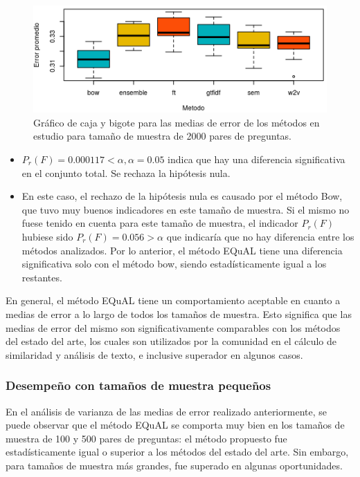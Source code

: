 \begin{figure}
	\centering
	\includegraphics[width=0.7\linewidth]{10_resultados/imagenes/anova_2000}
	\caption{Gráfico de caja y bigote para las medias de error de los métodos en estudio para tamaño de muestra de 2000 pares de preguntas.}
	\label{fig:anova2000}
\end{figure}

\begin{itemize}
	\item \(P_r(F)= 0.000117 < \alpha, \alpha = 0.05\) indica que hay una diferencia significativa en el conjunto total. Se rechaza la hipótesis nula.
	\item En este caso, el rechazo de la hipótesis nula es causado por el método Bow, que tuvo muy buenos indicadores en este tamaño de muestra. Si el mismo no fuese tenido en cuenta para este tamaño de muestra, el indicador \(P_r(F)\) hubiese sido  \(P_r(F)= 0.056 > \alpha\) que indicaría que no hay diferencia entre los métodos analizados. Por lo anterior, el método EQuAL tiene una diferencia significativa solo con el método bow, siendo estadísticamente igual a los restantes.
\end{itemize}

\bigskip En general, el método EQuAL tiene un comportamiento aceptable en cuanto a medias de error a lo largo de todos los tamaños de muestra. Esto significa que las medias de error del mismo son significativamente comparables con los métodos del estado del arte, los cuales son utilizados por la comunidad en el cálculo de similaridad y análisis de texto, e inclusive superador en algunos casos.

\subsubsection{Desempeño con tamaños de muestra pequeños}
En el análisis de varianza de las medias de error realizado anteriormente, se puede observar que el método EQuAL se comporta muy bien en los tamaños de muestra de 100 y 500 pares de preguntas: el método propuesto fue estadísticamente igual o superior a los métodos del estado del arte. Sin embargo, para tamaños de muestra más grandes, fue superado en algunas oportunidades.

